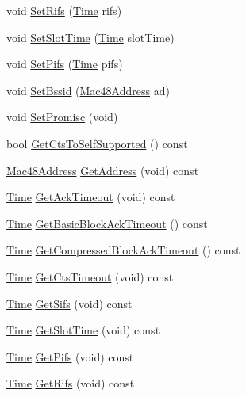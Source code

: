 \begin{DoxyCompactItemize}
\item 
void \hyperlink{classns3_1_1MacLow_a6ef95dfa5571e843bd91d5b26c658c82}{Set\+Rifs} (\hyperlink{classns3_1_1Time}{Time} rifs)
\item 
void \hyperlink{classns3_1_1MacLow_a4ee65e0fe3be7f52b42ea555ac8402b3}{Set\+Slot\+Time} (\hyperlink{classns3_1_1Time}{Time} slot\+Time)
\item 
void \hyperlink{classns3_1_1MacLow_aa8a6853ba185a9a5c1fddc2a8e6c91ad}{Set\+Pifs} (\hyperlink{classns3_1_1Time}{Time} pifs)
\item 
void \hyperlink{classns3_1_1MacLow_a92532da5f910843337b8bbb51f551c03}{Set\+Bssid} (\hyperlink{classns3_1_1Mac48Address}{Mac48\+Address} ad)
\item 
void \hyperlink{classns3_1_1MacLow_a3d6785cf29b733798a17c84036d42adf}{Set\+Promisc} (void)
\item 
bool \hyperlink{classns3_1_1MacLow_adc40feae5d8e06391308e136aa3beff3}{Get\+Cts\+To\+Self\+Supported} () const 
\item 
\hyperlink{classns3_1_1Mac48Address}{Mac48\+Address} \hyperlink{classns3_1_1MacLow_a109922d4f2bb1ee0b2a66aa3bcc48e2f}{Get\+Address} (void) const 
\item 
\hyperlink{classns3_1_1Time}{Time} \hyperlink{classns3_1_1MacLow_a41936a9436518d2fe881c9606dcef19e}{Get\+Ack\+Timeout} (void) const 
\item 
\hyperlink{classns3_1_1Time}{Time} \hyperlink{classns3_1_1MacLow_a5092888d73e7d32ac6172922f2469846}{Get\+Basic\+Block\+Ack\+Timeout} () const 
\item 
\hyperlink{classns3_1_1Time}{Time} \hyperlink{classns3_1_1MacLow_a57e8e9f643fe85b1c04812de618efbee}{Get\+Compressed\+Block\+Ack\+Timeout} () const 
\item 
\hyperlink{classns3_1_1Time}{Time} \hyperlink{classns3_1_1MacLow_aba3db8af06fbd9e80a0d6c35dc1f3cf4}{Get\+Cts\+Timeout} (void) const 
\item 
\hyperlink{classns3_1_1Time}{Time} \hyperlink{classns3_1_1MacLow_a9107421b7ed9f291d60b8344b4918e56}{Get\+Sifs} (void) const 
\item 
\hyperlink{classns3_1_1Time}{Time} \hyperlink{classns3_1_1MacLow_a8a1429d2aba218b4a4e2e5ad37dce6c8}{Get\+Slot\+Time} (void) const 
\item 
\hyperlink{classns3_1_1Time}{Time} \hyperlink{classns3_1_1MacLow_a77f1f7d4ee6eb16b0fed4975000cb3bc}{Get\+Pifs} (void) const 
\item 
\hyperlink{classns3_1_1Time}{Time} \hyperlink{classns3_1_1MacLow_add308ae9aa7b74b3132cd270c5dbfb22}{Get\+Rifs} (void) const 

\end{DoxyCompactItemize}
